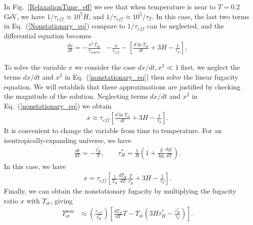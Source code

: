 In Fig.~\ref{RelaxationTime_eff} we see that when temperature is near to $T=0.2$ GeV, we have $1/\tau_{eff}\approx10^{7}H$, and $1/\tau_{eff}\approx10^5/\tau_T$. In this case, the last two terms in Eq.~(\ref{Nonstationary_eq}) compare to $1/\tau_{eff}$ can be neglected, and the differential equation becomes
\begin{align}\label{nonstationary_eq}
\frac{dx}{dt}=-\frac{x^2\,\Upsilon_\mathrm{st}}{\tau_{source}}&-\frac{x}{\tau_{eff}}-\left[\frac{d\ln\Upsilon_\mathrm{st}}{dt}+3H-\frac{1}{\tau_T}\right],
\end{align}


To solve the variable $x$ we consider the case $dx/dt,x^2\ll1$ first, we neglect the terms $dx/dt$ and $x^2$ in Eq.~(\ref{nonstationary_eq})  then solve the linear fugacity equation.  We will establish that these approximations are justified by checking the magnitude of the solution. Neglecting terms $dx/dt$ and $x^2$ in Eq.~(\ref{nonstationary_eq}) we obtain
\begin{align}
x\approx\tau_{eff}\left[\frac{d\ln\Upsilon_\mathrm{st}}{dt}+3H-\frac{1}{\tau_T}\right].
\end{align}
It is convenient to change the variable from time to temperature. For an isentropically-expanding universe, we have
\begin{align}\label{tau_H}
\frac{dt}{dT}=-\frac{\tau^\ast_H}{T},\qquad \tau^\ast_H=\frac{1}{H}\left(1+\frac{T}{3g^s_\ast}\frac{dg^s_\ast}{dT}\right).
\end{align}
In this case, we have
\begin{align}
x=\tau_{eff}\left[\frac{1}{\Upsilon_\mathrm{st}}\frac{d\Upsilon_\mathrm{st}}{dT}\frac{T}{\tau^\ast_H}+3H-\frac{1}{\tau_T}\right].
\end{align}
Finally, we can obtain the nonstationary fugacity by multiplying the fugacity ratio $x$ with $\Upsilon_\mathrm{st}$, giving
\begin{align}
\Upsilon_{\mathrm{st}}^{\mathrm{non}}
&\approx\left(\frac{\tau_{eff}}{\tau^\ast_H}\right)\left[\frac{d\Upsilon_\mathrm{st}}{dT}T-\Upsilon_{\mathrm{st}}\left(3H\tau^\ast_H-\frac{\tau^\ast_H}{\tau_T}\right)\right].
\end{align}

